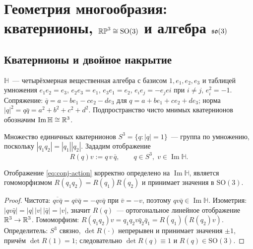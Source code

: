 \needspace{0.25\textheight}
\section{Геометрия многообразия: кватернионы, \texorpdfstring{$\mathbb{RP}^3 \cong \mathrm{SO}(3)$}{RP3=SO(3)} и алгебра \texorpdfstring{$\mathfrak{so}(3)$}{so(3)}}\label{sec:geom}

\subsection{Кватернионы и двойное накрытие}

\begin{definition}\label{def:quat}
$\mathbb H$~--- четырёхмерная вещественная алгебра с базисом
$1, e_1, e_2, e_3$ и таблицей умножения
$e_1e_2 = e_3$, $e_2e_3 = e_1$, $e_3e_1 = e_2$,
$e_ie_j = -e_jei$ при $i \ne j$, $e_i^2 = -1$. Сопряжение:
$\overline{q} = a - be_1 - ce_2 - de_3$ для $q = a + be_1 + ce_2 + de_3$;
норма $|q|^2 = q\bar q = a^2 + b^2 + c^2 + d^2$. Подпространство чисто
мнимых кватернионов обозначим $\operatorname{Im}\mathbb H \cong \mathbb{R}^3$.
\end{definition}

Множество единичных кватернионов $S^3 = \{q : |q| = 1\}$~--- группа
по умножению, поскольку $|q_1q_2| = |q_1||q_2|$. Зададим отображение
\begin{equation}\label{eq:conj-action}
  R(q)v := q\,v\,\bar q, \qquad q \in S^3,\; v \in \operatorname{Im}\mathbb H .
\end{equation}

\begin{lemma}\label{lem:conjugation}
Отображение \eqref{eq:conj-action} корректно определено на
$\operatorname{Im}\mathbb H$, является гомоморфизмом
$R(q_1q_2) = R(q_1)R(q_2)$ и принимает значения в $\mathrm{SO}(3)$.
\end{lemma}

\begin{proof}
Чистота: $\overline{qv\bar q} = q\bar v \bar q = -qv\bar q$ при
$\bar v = -v$, поэтому $qv\bar q \in \operatorname{Im}\mathbb H$.
Изометрия: $|qv\bar q| = |q|\,|v|\,|\bar q| = |v|$, значит $R(q)$~---
ортогональное линейное отображение $\mathbb{R}^3 \to \mathbb{R}^3$. Гомоморфизм:
$R(q_1q_2)v = q_1q_2 v \bar q_2 \bar q_1 = R(q_1)(R(q_2)v)$.
Определитель: $S^3$ связно, $\det R(\cdot)$ непрерывен и принимает
значения $\pm 1$, причём $\det R(1) = 1$; следовательно
$\det R(q) \equiv 1$ и $R(q) \in \mathrm{SO}(3)$.
\end{proof}

